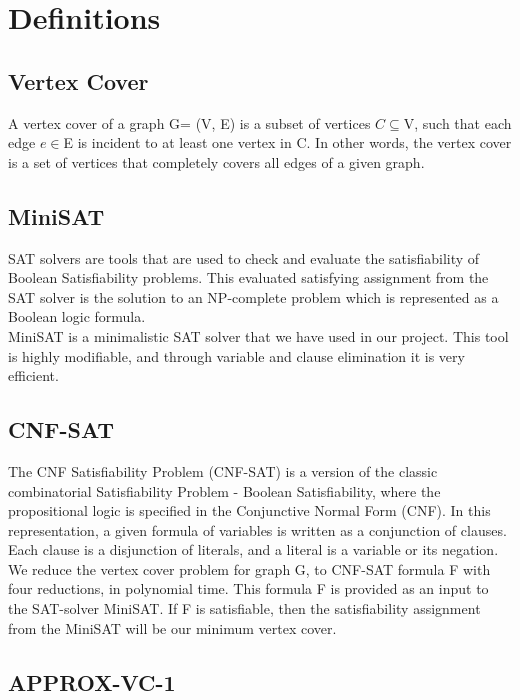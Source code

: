 \documentclass{article}
\begin{document}
\section{Definitions}

\subsection{Vertex Cover}

A vertex cover of a graph G= \textsc(V, E) is a subset of vertices $C \subseteq $V, such that each edge $e \in $E is incident to at least one vertex in C. In other words, the vertex cover is a set of vertices that completely covers all edges of a given graph. 

\subsection{MiniSAT}

SAT solvers are tools that are used to check and evaluate the satisfiability of Boolean Satisfiability problems. This evaluated satisfying assignment from the SAT solver is the solution to an NP-complete problem which is represented as a Boolean logic formula. \\

MiniSAT is a minimalistic SAT solver that we have used in our project. This tool is highly modifiable, and through variable and clause elimination it is very efficient.

\subsection{CNF-SAT}

The CNF Satisfiability Problem (CNF-SAT) is a version of the classic combinatorial Satisfiability Problem - Boolean Satisfiability, where the propositional logic is specified in the Conjunctive Normal Form (CNF). In this representation, a given formula of variables is written as a conjunction of clauses. Each clause is a disjunction of literals, and a literal is a variable or its negation.\\

We reduce the vertex cover problem for graph G, to CNF-SAT formula F with four reductions, in polynomial time. This formula F is provided as an input to the SAT-solver MiniSAT. If F is satisfiable, then the satisfiability assignment from the MiniSAT will be our minimum vertex cover.

\subsection{APPROX-VC-1}
\end{document}
